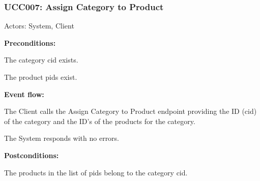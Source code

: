 \begin{ucbox}{\subsubsection{UCC007: Assign Category to Product}}
\label{UCC007}

Actors: System, Client

\textbf{Preconditions:}

\ucitem The category cid exists.

\ucitem The product pids exist.

\textbf{Event flow:}

\ucitem The Client calls the Assign Category to Product endpoint providing the ID (cid) of the category and the ID’s of the products for the category.

\ucitem The System responds with no errors.

\textbf{Postconditions:}

\ucitem The products in the list of pids belong to the category cid.

\end{ucbox}
\newpage